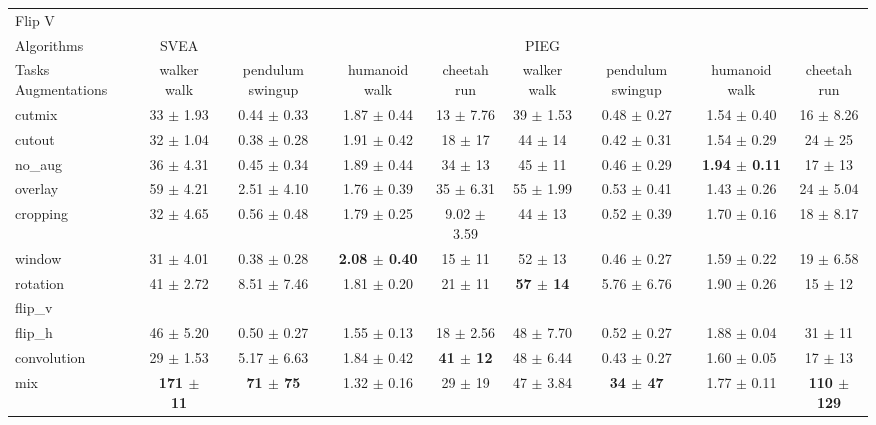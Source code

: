 \begin{tabular}{lcccccccc}
Flip V & & & & & & & & \\
Algorithms & SVEA & & & & PIEG & & & \\
Tasks Augmentations & walker walk & pendulum swingup & humanoid walk & cheetah run & walker walk & pendulum swingup & humanoid walk & cheetah run \\
cutmix          & 33 $\pm$ 1.93 & 0.44 $\pm$ 0.33 & 1.87 $\pm$ 0.44 & 13 $\pm$ 7.76 & 39 $\pm$ 1.53 & 0.48 $\pm$ 0.27 & 1.54 $\pm$ 0.40 & 16 $\pm$ 8.26 \\
cutout          & 32 $\pm$ 1.04 & 0.38 $\pm$ 0.28 & 1.91 $\pm$ 0.42 & 18 $\pm$ 17 & 44 $\pm$ 14 & 0.42 $\pm$ 0.31 & 1.54 $\pm$ 0.29 & 24 $\pm$ 25 \\
no\_aug         & 36 $\pm$ 4.31 & 0.45 $\pm$ 0.34 & 1.89 $\pm$ 0.44 & 34 $\pm$ 13 & 45 $\pm$ 11 & 0.46 $\pm$ 0.29 & \textbf{1.94 $\pm$ 0.11} & 17 $\pm$ 13 \\
overlay         & 59 $\pm$ 4.21 & 2.51 $\pm$ 4.10 & 1.76 $\pm$ 0.39 & 35 $\pm$ 6.31 & 55 $\pm$ 1.99 & 0.53 $\pm$ 0.41 & 1.43 $\pm$ 0.26 & 24 $\pm$ 5.04 \\
cropping        & 32 $\pm$ 4.65 & 0.56 $\pm$ 0.48 & 1.79 $\pm$ 0.25 & 9.02 $\pm$ 3.59 & 44 $\pm$ 13 & 0.52 $\pm$ 0.39 & 1.70 $\pm$ 0.16 & 18 $\pm$ 8.17 \\
window          & 31 $\pm$ 4.01 & 0.38 $\pm$ 0.28 & \textbf{2.08 $\pm$ 0.40} & 15 $\pm$ 11 & 52 $\pm$ 13 & 0.46 $\pm$ 0.27 & 1.59 $\pm$ 0.22 & 19 $\pm$ 6.58 \\
rotation        & 41 $\pm$ 2.72 & 8.51 $\pm$ 7.46 & 1.81 $\pm$ 0.20 & 21 $\pm$ 11 & \textbf{57 $\pm$ 14} & 5.76 $\pm$ 6.76 & 1.90 $\pm$ 0.26 & 15 $\pm$ 12 \\
flip\_v         &  &  &  &  &  &  &  &  \\
flip\_h         & 46 $\pm$ 5.20 & 0.50 $\pm$ 0.27 & 1.55 $\pm$ 0.13 & 18 $\pm$ 2.56 & 48 $\pm$ 7.70 & 0.52 $\pm$ 0.27 & 1.88 $\pm$ 0.04 & 31 $\pm$ 11 \\
convolution     & 29 $\pm$ 1.53 & 5.17 $\pm$ 6.63 & 1.84 $\pm$ 0.42 & \textbf{41 $\pm$ 12} & 48 $\pm$ 6.44 & 0.43 $\pm$ 0.27 & 1.60 $\pm$ 0.05 & 17 $\pm$ 13 \\
mix             & \textbf{171 $\pm$ 11} & \textbf{71 $\pm$ 75} & 1.32 $\pm$ 0.16 & 29 $\pm$ 19 & 47 $\pm$ 3.84 & \textbf{34 $\pm$ 47} & 1.77 $\pm$ 0.11 & \textbf{110 $\pm$ 129} \\
\end{tabular}